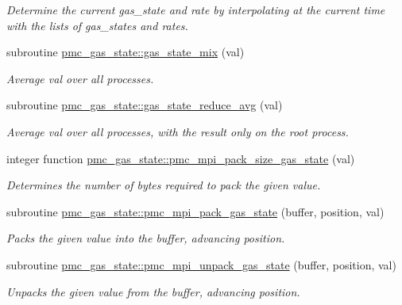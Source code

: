 \begin{DoxyCompactItemize}
\begin{DoxyCompactList}\small\item\em Determine the current gas\+\_\+state and rate by interpolating at the current time with the lists of gas\+\_\+states and rates. \end{DoxyCompactList}\item 
subroutine \mbox{\hyperlink{namespacepmc__gas__state_a119c0276d5da30938468361b975dad19}{pmc\+\_\+gas\+\_\+state\+::gas\+\_\+state\+\_\+mix}} (val)
\begin{DoxyCompactList}\small\item\em Average val over all processes. \end{DoxyCompactList}\item 
subroutine \mbox{\hyperlink{namespacepmc__gas__state_a8423bef411d25375dfd0b897f38f117b}{pmc\+\_\+gas\+\_\+state\+::gas\+\_\+state\+\_\+reduce\+\_\+avg}} (val)
\begin{DoxyCompactList}\small\item\em Average val over all processes, with the result only on the root process. \end{DoxyCompactList}\item 
integer function \mbox{\hyperlink{namespacepmc__gas__state_a2c2f0e95ffd10c3821f774e371d54d37}{pmc\+\_\+gas\+\_\+state\+::pmc\+\_\+mpi\+\_\+pack\+\_\+size\+\_\+gas\+\_\+state}} (val)
\begin{DoxyCompactList}\small\item\em Determines the number of bytes required to pack the given value. \end{DoxyCompactList}\item 
subroutine \mbox{\hyperlink{namespacepmc__gas__state_a4bb38e6e0dabd7944df3a2ce21020b92}{pmc\+\_\+gas\+\_\+state\+::pmc\+\_\+mpi\+\_\+pack\+\_\+gas\+\_\+state}} (buffer, position, val)
\begin{DoxyCompactList}\small\item\em Packs the given value into the buffer, advancing position. \end{DoxyCompactList}\item 
subroutine \mbox{\hyperlink{namespacepmc__gas__state_a1b00ba3d007dfa64c0855d8446b414ff}{pmc\+\_\+gas\+\_\+state\+::pmc\+\_\+mpi\+\_\+unpack\+\_\+gas\+\_\+state}} (buffer, position, val)
\begin{DoxyCompactList}\small\item\em Unpacks the given value from the buffer, advancing position. \end{DoxyCompactList}\item 

\end{DoxyCompactItemize}
